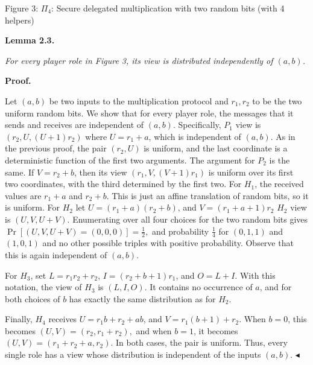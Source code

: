 \documentclass[10pt,a4paper]{article}
\begin{document}
Figure 3: $\Pi_{4}$: Secure delegated multiplication with two random bits (with 4 helpers)




\par\medskip\noindent\textbf{
\textbf{Lemma 2.3}\textbf{.}
}\par



\emph{For every player role in Figure 3, its view is distributed independently of $(a,b)$.}\par






\par\medskip\noindent\textbf{Proof.}\par




Let $(a,b)$ be two inputs to the multiplication protocol and $r_{1},r_{2}$ to be the two uniform random bits. We show that for every player role, the messages that it sends and receives are independent of $(a,b)$.
Specifically, $P_{1}$ view is
$(r_{2},U,(U+1)r_{2})$ where $U=r_{1}+a$, which is independent of $(a,b)$.
As in the previous proof, the pair $(r_{2},U)$ is uniform, and the last coordinate is a deterministic function of the first two arguments. The argument for $P_{2}$ is the same. If $V=r_{2}+b$, then its view
$(r_{1},V,(V+1)r_{1})$
is uniform over its first two coordinates, with the third determined by the first two.
For $H_{1}$, the received values are $r_{1}+a$ and $r_{2}+b$. This is just an affine translation of random bits, so it is uniform. For $H_{2}$ let
$U=(r_{1}+a)(r_{2}+b)$, and $V=(r_{1}+a+1)r_{2}$
$H_{2}$ view is $(U,V,U+V)$. Enumerating over all four choices for the two random bits gives
$\Pr[(U,V,U+V)=(0,0,0)]=\frac{1}{2},$
and probability $\frac{1}{4}$ for
$(0,1,1)$ and $(1,0,1)$ and no other possible triples with positive probability. Observe that this is again independent of $(a,b)$.\par




For $H_{3}$, set
$L=r_{1}r_{2}+r_{2}$, $I=(r_{2}+b+1)r_{1}$, and $O=L+I$. With this notation,
the view of $H_{3}$ is $(L,I,O)$. It contains no occurrence of $a$, and for both choices of $b$ has exactly the same distribution as for $H_{2}$.\par




Finally, $H_{4}$ receives
$U=r_{1}b+r_{2}+ab$, and $V=r_{1}(b+1)+r_{2}$.
When $b=0$, this becomes
$(U,V)=(r_{2},r_{1}+r_{2}),$
and when $b=1$, it becomes
$(U,V)=(r_{1}+r_{2}+a,r_{2}).$
In both cases, the pair is uniform.
Thus, every single role has a view whose distribution is independent of the inputs $(a,b)$.
$\blacktriangleleft$\par
\end{document}
